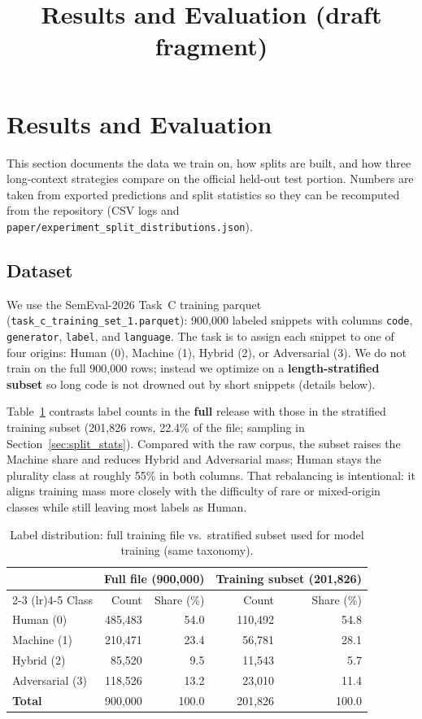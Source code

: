 \documentclass[10pt]{article}
\title{Results and Evaluation (draft fragment)}
\author{}
\date{}
\begin{document}
\maketitle

\section{Results and Evaluation}

This section documents the data we train on, how splits are built, and how three long-context strategies compare on the official held-out test portion. Numbers are taken from exported predictions and split statistics so they can be recomputed from the repository (CSV logs and \texttt{paper/experiment\_split\_distributions.json}).

\subsection{Dataset}
We use the SemEval-2026 Task~C training parquet (\texttt{task\_c\_training\_set\_1.parquet}): 900{,}000 labeled snippets with columns \texttt{code}, \texttt{generator}, \texttt{label}, and \texttt{language}. The task is to assign each snippet to one of four origins: Human (0), Machine (1), Hybrid (2), or Adversarial (3). We do not train on the full 900{,}000 rows; instead we optimize on a \textbf{length-stratified subset} so long code is not drowned out by short snippets (details below).

Table~\ref{tab:train_dist} contrasts label counts in the \textbf{full} release with those in the stratified training subset (201{,}826 rows, 22.4\% of the file; sampling in Section~\ref{sec:split_stats}). Compared with the raw corpus, the subset raises the Machine share and reduces Hybrid and Adversarial mass; Human stays the plurality class at roughly 55\% in both columns. That rebalancing is intentional: it aligns training mass more closely with the difficulty of rare or mixed-origin classes while still leaving most labels as Human.

\begin{table}[htbp]
  \centering
  \caption{Label distribution: full training file vs.\ stratified subset used for model training (same taxonomy).}
  \label{tab:train_dist}
  \begin{tabular}{@{}l rr rr@{}}
    \toprule
    & \multicolumn{2}{c}{Full file (900{,}000)} & \multicolumn{2}{c}{Training subset (201{,}826)} \\
    \cmidrule(lr){2-3} \cmidrule(lr){4-5}
    Class & Count & Share (\%) & Count & Share (\%) \\
    \midrule
    Human (0)        & 485{,}483 & 54.0 & 110{,}492 & 54.8 \\
    Machine (1)      & 210{,}471 & 23.4 &  56{,}781 & 28.1 \\
    Hybrid (2)       &  85{,}520 &  9.5 &  11{,}543 &  5.7 \\
    Adversarial (3)  & 118{,}526 & 13.2 &  23{,}010 & 11.4 \\
    \midrule
    \textbf{Total}   & 900{,}000 & 100.0 & 201{,}826 & 100.0 \\
    \bottomrule
  \end{tabular}
\end{table}
\end{document}
